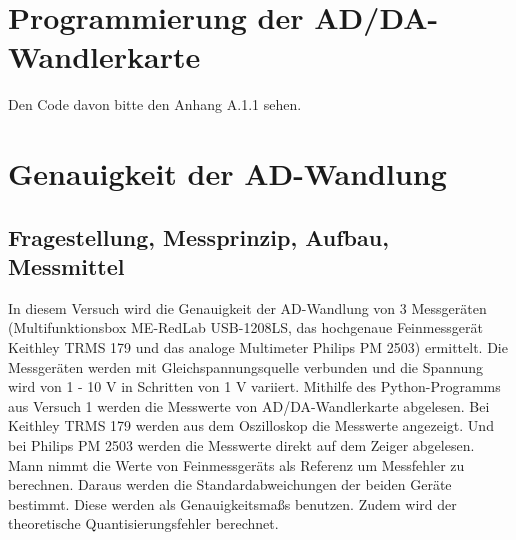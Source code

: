 \documentclass[12pt, oneside, a4paper, \docLanguage]{report}
\begin{document}

\setcounter{section}{0}



\clearpage

%
%


%
%


%
%





\setcounter{page}{1} 
\pagestyle{default}

%
%
\chapter{Programmierung der AD/DA-Wandlerkarte}

Den Code davon bitte den Anhang A.1.1 sehen.




%
%
\chapter{Genauigkeit der AD-Wandlung}
\section{Fragestellung, Messprinzip, Aufbau, Messmittel}
\qquad In diesem Versuch wird die Genauigkeit der AD-Wandlung von 3 Messgeräten (Multifunktionsbox ME-RedLab USB-1208LS, das hochgenaue Feinmessgerät Keithley TRMS 179 und das analoge Multimeter Philips PM 2503) ermittelt. Die Messgeräten werden mit Gleichspannungsquelle verbunden und die Spannung wird von 1 - 10 V in Schritten von 1 V variiert. Mithilfe des Python-Programms aus Versuch 1 werden die Messwerte von AD/DA-Wandlerkarte abgelesen. Bei Keithley TRMS 179 werden aus dem Oszilloskop die Messwerte angezeigt. Und bei Philips PM 2503 werden die Messwerte direkt auf dem Zeiger abgelesen. Mann nimmt die Werte von Feinmessgeräts als Referenz um Messfehler zu berechnen. Daraus werden die Standardabweichungen der beiden Geräte bestimmt. Diese werden als  Genauigkeitsmaßs benutzen. Zudem wird der theoretische Quantisierungsfehler berechnet. 
\end{document}
